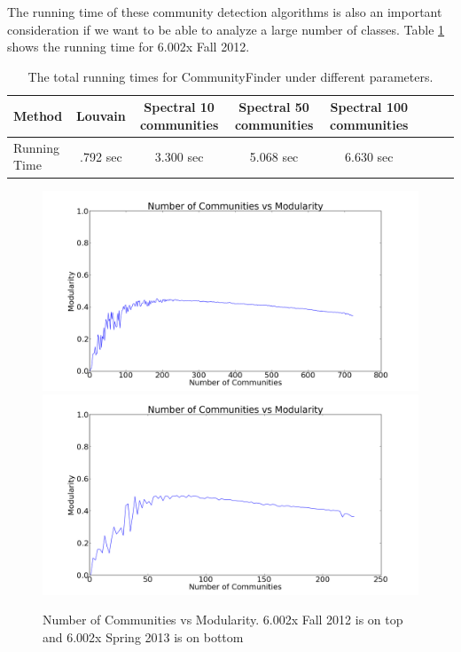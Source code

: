 The running time of these community detection algorithms is also an important consideration if we want to be able to analyze a large number of classes. Table \ref{time} shows the running time for 6.002x Fall 2012. 

\begin{table}[!htb]
\centering
    \begin{tabular}{l*{6}{c}r}
    Method & Louvain & Spectral 10 communities & Spectral 50 communities & Spectral 100 communities\\
    \hline
    Running Time & .792 sec & 3.300 sec  & 5.068 sec & 6.630 sec \\
    \end{tabular}
\caption{The total running times for CommunityFinder under different parameters.}
\label{time}
\end{table} 

\begin{figure}[!htb]
  \centering
  \includegraphics[width=.8\linewidth]{modularityf12.png}
  \includegraphics[width=.8\linewidth]{modularitys13.png}
  \caption{Number of Communities vs Modularity. 6.002x Fall 2012 is on top and 6.002x Spring 2013 is on bottom}
  \label{modularity}
\end{figure}



